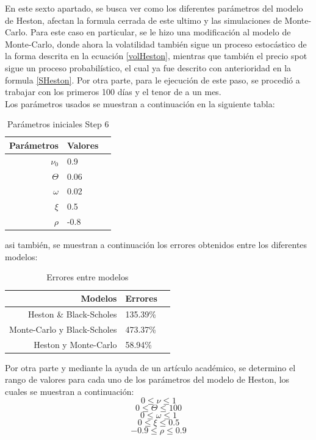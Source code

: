 \noindent En este sexto apartado, se busca ver como los diferentes parámetros del modelo de Heston, afectan la formula cerrada de este ultimo y las simulaciones de Monte-Carlo. Para este caso en particular, se le hizo una modificación al modelo de Monte-Carlo, donde ahora la volatilidad también sigue un proceso estocástico de la forma descrita en la ecuación \ref{volHeston}, mientras que también el precio spot sigue un proceso probabilístico, el cual ya fue descrito con anterioridad en la formula \ref{SHeston}. Por otra parte, para le ejecución de este paso, se procedió a trabajar con los primeros 100 días y el tenor de a un mes. \\ Los parámetros usados se muestran a continuación en la siguiente tabla:

\begin{table}[h]
\begin{center}
\begin{tabular}{| r | l | c |}
\hline 
Parámetros & Valores  \\ \hline
$\nu_0$ & 0.9  \\
$\Theta$ & 0.06  \\
$\omega$ & 0.02    \\
$\xi$ & 0.5   \\
$\rho$ & -0.8 \\ \hline
\end{tabular}
\caption{Parámetros iniciales Step 6}
\end{center}
\end{table}
asi también, se muestran a continuación los errores obtenidos entre los diferentes modelos:

\begin{table}[h]
\begin{center}
\begin{tabular}{| r | l | c |}
\hline 
Modelos & Errores  \\ \hline
Heston \& Black-Scholes & 135.39\% \\
Monte-Carlo y Black-Scholes & 473.37\%  \\
Heston y Monte-Carlo & 58.94\% \\ \hline
\end{tabular}
\caption{Errores entre modelos}
\label{tab:errormod}
\end{center}
\end{table}
Por otra parte y mediante la ayuda de un artículo académico, se determino el rango de valores para cada uno de los parámetros del modelo de Heston, los cuales se muestran a continuación: 
\begin{equation*}
	0\le \nu	\le1
\end{equation*}
\begin{equation*}
0	\le \Theta	\le100
\end{equation*}
\begin{equation*}
	0\le \omega	\le1
\end{equation*}
\begin{equation*}
0	\le \xi	\le0.5
\end{equation*}
\begin{equation*}
-0.9	\le \rho	\le0.9
\end{equation*}

